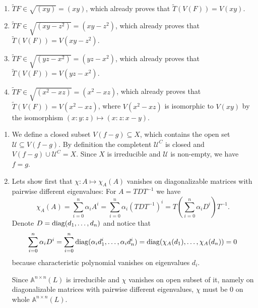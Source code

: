\begin{exercise}{2}
\begin{enumerate}
\begin{enumerate}
                \item{} $\widetilde{T}F \in \sqrt{(xy)} = (xy)$, which already
                    proves that $\widetilde{T}(V(F)) = V(xy)$.
                \item{} $\widetilde{T}F \in \sqrt{(xy - z^2)} = (xy - z^2)$, which already
                    proves that $\widetilde{T}(V(F)) = V(xy - z^2)$.
                \item{} $\widetilde{T}F \in \sqrt{(yz - x^2)} = (yz - x^2)$, which already
                    proves that $\widetilde{T}(V(F)) = V(yz - x^2)$.
                \item{} $\widetilde{T}F \in \sqrt{(x^2 - xz)} = (x^2 - xz)$, which already
                    proves that $\widetilde{T}(V(F)) = V(x^2 - xz)$, where
                    $V(x^2 - xz)$ is isomorphic to $V(xy)$ by the isomorphism
                    $(x : y : z) \mapsto (x : z : x - y)$.
            \end{enumerate}

    \end{enumerate}
\end{exercise}

\begin{exercise}{3}
    \begin{enumerate}
        \item{} We define a closed subset $V(f - g) \subseteq X$, which contains
            the open set $\mathcal{U} \subseteq V(f - g)$. By definition the
            completent $\mathcal{U}^C$ is closed and $V(f - g) \cup
            \mathcal{U}^C = X$. Since $X$ is irreducible and $\mathcal{U}$ is
            non-empty, we have $f = g$.

        \item{} Lets show first that $\chi \colon A \mapsto \chi_A(A)$ vanishes
            on diagonalizable matrices with pairwise different eigenvalues: For
            $A = T D T^{-1}$ we have
            \begin{equation*}
                \chi_A(A) = \sum^n_{i = 0} \alpha_i A^i = \sum^n_{i = 0}
                \alpha_i (T D T^{-1})^i = T \left( \sum^n_{i = 0} \alpha_i  D^i
                \right) T^{-1}.
            \end{equation*}
            Denote $D = \operatorname{diag}(d_1, \dots, d_n)$ and notice that
            \begin{equation*}
                \sum^n_{i = 0} \alpha_i  D^i = 
                \sum^n_{i = 0} \operatorname{diag}(\alpha_i d^i_1, \dots, \alpha_i d^i_n) = 
                \operatorname{diag}(\chi_A(d_1), \dots, \chi_A(d_n)) = 0
            \end{equation*}
            because characteristic polynomial vanishes on eigenvalues $d_i$.

            Since $\mathbb{A}^{n \times n}(L)$ is irreducible
            and $\chi$ vanishes on open subset of it, namely on diagonalizable
            matrices with pairwise different eigenvalues, $\chi$ must be $0$ on
            whole $\mathbb{A}^{n \times n}(L)$.
    \end{enumerate}
\end{exercise}

